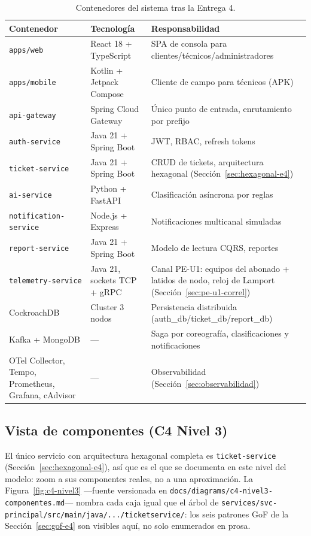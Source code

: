 \begin{table}[H]
\centering
\small
\caption{Contenedores del sistema tras la Entrega 4.}
\label{tab:contenedores-e4}
\begin{tabular}{@{}p{3.1cm}p{2.6cm}p{7.8cm}@{}}
\toprule
\textbf{Contenedor} & \textbf{Tecnología} & \textbf{Responsabilidad} \\
\midrule
\texttt{apps/web} & React 18 + TypeScript & SPA de consola para clientes/técnicos/administradores \\
\texttt{apps/mobile} & Kotlin + Jetpack Compose & Cliente de campo para técnicos (APK) \\
\texttt{api-gateway} & Spring Cloud Gateway & Único punto de entrada, enrutamiento por prefijo \\
\texttt{auth-service} & Java 21 + Spring Boot & JWT, RBAC, refresh tokens \\
\texttt{ticket-service} & Java 21 + Spring Boot & CRUD de tickets, arquitectura hexagonal (Sección~\ref{sec:hexagonal-e4}) \\
\texttt{ai-service} & Python + FastAPI & Clasificación asíncrona por reglas \\
\texttt{notification-service} & Node.js + Express & Notificaciones multicanal simuladas \\
\texttt{report-service} & Java 21 + Spring Boot & Modelo de lectura CQRS, reportes \\
\texttt{telemetry-service} & Java 21, sockets TCP + gRPC & Canal PE-U1: equipos del abonado + latidos de nodo, reloj de Lamport (Sección~\ref{sec:pe-u1-correl}) \\
CockroachDB & Cluster 3 nodos & Persistencia distribuida (auth\_db/ticket\_db/report\_db) \\
Kafka + MongoDB & --- & Saga por coreografía, clasificaciones y notificaciones \\
OTel Collector, Tempo, Prometheus, Grafana, cAdvisor & --- & Observabilidad (Sección~\ref{sec:observabilidad}) \\
\bottomrule
\end{tabular}
\end{table}

\subsection{Vista de componentes (C4 Nivel 3)}
\label{sec:c4-nivel3}

El único servicio con arquitectura hexagonal completa es \texttt{ticket-service}
(Sección~\ref{sec:hexagonal-e4}), así que es el que se documenta en este nivel del modelo:
zoom a sus componentes reales, no a una aproximación. La Figura~\ref{fig:c4-nivel3} —fuente
versionada en \texttt{docs/diagrams/c4-nivel3-componentes.md}— nombra cada caja igual que el
árbol de \texttt{services/svc-principal/src/main/java/.../ticketservice/}: los seis patrones GoF
de la Sección~\ref{sec:gof-e4} son visibles aquí, no solo enumerados en prosa.

